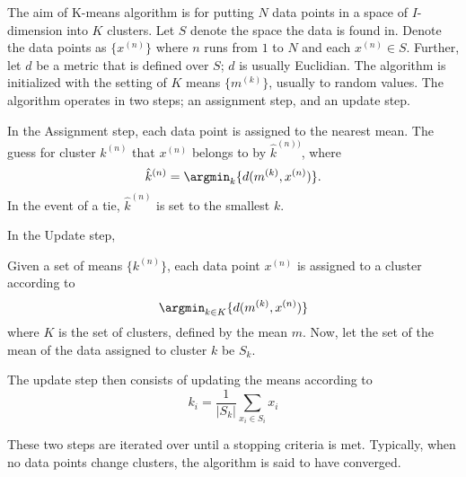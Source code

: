 The aim of K-means algorithm is for putting $N$ data points in a space of $I$-dimension into $K$ clusters. Let $S$ denote the space the data is found in. Denote the data points as $\{x^{(n)}\}$ where $n$ runs from $1$ to $N$ and each $x^{(n)}\in S$. Further, let $d$ be a metric that is defined over $S$; $d$ is usually Euclidian. The algorithm is initialized with the setting of $K$ means $\{m^{(k)}\}$, usually to random values. The algorithm operates in two steps; an assignment step, and an update step.

In the Assignment step, each data point is assigned to the nearest mean. The guess for cluster $k^{(n)}$ that $x^{(n)}$ belongs to by $\hat{k}^{(n))}$, where
	\begin{equation}
		\hat{k}^{(n)} = \argmin_k\{d(m^{(k)},x^{(n)})\}.
	\end{equation}
In the event of a tie, $\hat{k}^{(n)}$ is set to the smallest $k$.

In the Update step, 

Given a set of means $\{k^{(n)}\}$, each data point $x^{(n)}$ is assigned to a cluster according to  
	\begin{equation}
		\argmin_{k\in K}\{d(m^{(k)},x^{(n)})\}
	\end{equation}
where $K$ is the set of clusters, defined by the mean $m$. Now, let the set of the mean of the data assigned to cluster $k$ be $S_k$.

The update step then consists of updating the means according to
	\begin{equation}
		k_i = \frac{1}{|S_k|}\sum_{x_i \in S_i} x_i
	\end{equation} 

These two steps are iterated over until a stopping criteria is met. Typically, when no data points change clusters, the algorithm is said to have converged.